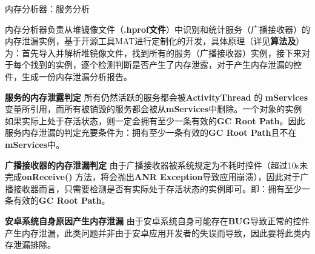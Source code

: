 \begin{algorithm}
	\caption{内存分析器：服务分析}
	\label{alg:memory analyser:receiver}
	\begin{algorithmic}[1]
					\ELSE
					\ENDIF
				\ENDIF
			\ENDIF
		\ENDFOR
	\end{algorithmic}
\end{algorithm}

内存分析器负责从堆镜像文件（\textbf{.hprof文件}）中识别和统计服务（广播接收器）的内存泄漏实例，基于开源工具MAT\cite{mat}进行定制化的开发，具体原理（详见\textbf{算法\redbf{\ref{alg:memory analyser:service}}及\redbf{\ref{alg:memory analyser:receiver}}}）为：首先导入并解析堆镜像文件，找到所有的服务（广播接收器）实例，接下来对于每个找到的实例，逐个检测判断是否产生了内存泄露，对于产生内存泄漏的控件，生成一份内存泄漏分析报告。

\textbf{服务的内存泄露判定 } 所有仍然活跃的服务都会被\textbf{ActivityThread} 的 \textbf{mServices}变量所引用，而所有被销毁的服务都会被从\textbf{mServices}中删除。一个对象的实例如果实际上处于存活状态，则一定会拥有至少一条有效的\textbf{GC Root Path}。因此服务内存泄漏的判定充要条件为：拥有至少一条有效的\textbf{GC Root Path}且不在\textbf{mServices}中。

\textbf{广播接收器的内存泄漏判定 } 由于广播接收器被系统规定为不耗时控件（超过10s未完成\textbf{onReceive()} 方法，将会抛出\textbf{ANR Exception}导致应用崩溃），因此对于广播接收器而言，只需要检测是否有实际处于存活状态的实例即可。即：拥有至少一条有效的\textbf{GC Root Path}。

\textbf{安卓系统自身原因产生内存泄漏 } 由于安卓系统自身可能存在\textbf{BUG}导致正常的控件产生内存泄漏，此类问题并非由于安卓应用开发者的失误而导致，因此要将此类内存泄漏排除。
